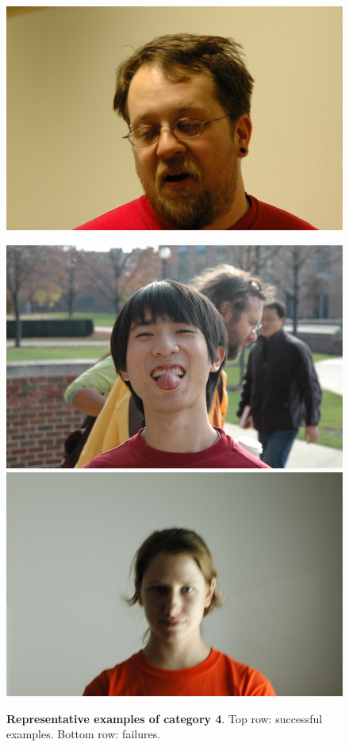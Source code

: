 \begin{figure}
\includegraphics[scale=0.35,clip=true]{figures_cvpr/examples/4/failure/DSC_1985.JPG} 
 \caption{{\bf Representative examples of category 4}. Top row: successful examples. Bottom row: failures.}\label{fig:examples4}
\vspace{0mm}
\centering
\includegraphics[scale=0.35,clip=true]{figures_cvpr/examples/5/success/DSC_1664.JPG} 
\includegraphics[scale=0.35,clip=true]{figures_cvpr/examples/5/success/DSC_1777.JPG} 

\end{figure}
